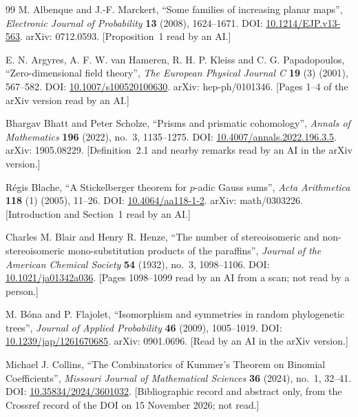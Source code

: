 \documentclass[11pt]{article}
\theoremstyle{definition}
\theoremstyle{remark}
\numberwithin{equation}{section}
\numberwithin{figure}{section}
\begin{document}
\begin{thebibliography}{99}\small
{}
M. Albenque and J.-F. Marckert, ``Some families of increasing planar maps'', \emph{Electronic Journal of
Probability} \textbf{13} (2008), 1624--1671. DOI: \href{https://doi.org/10.1214/EJP.v13-563}{10.1214/EJP.v13-563}.
arXiv: 0712.0593. [Proposition~1 read by an AI.]

E. N. Argyres, A. F. W. van Hameren, R. H. P. Kleiss and C. G. Papadopoulos, ``Zero-dimensional field theory'',
\emph{The European Physical Journal C} \textbf{19} (3) (2001), 567--582. DOI:
\href{https://doi.org/10.1007/s100520100630}{10.1007/s100520100630}. arXiv: hep-ph/0101346. [Pages 1--4 of the
arXiv version read by an AI.]

Bhargav Bhatt and Peter Scholze, ``Prisms and prismatic cohomology'', \emph{Annals of Mathematics}
\textbf{196} (2022), no.~3, 1135--1275. DOI:
\href{https://doi.org/10.4007/annals.2022.196.3.5}{10.4007/annals.2022.196.3.5}. arXiv: 1905.08229.
[Definition~2.1 and nearby remarks read by an AI in the arXiv version.]

R\'egis Blache, ``A Stickelberger theorem for $p$-adic Gauss sums'', \emph{Acta Arithmetica} \textbf{118} (1)
(2005), 11--26. DOI: \href{https://doi.org/10.4064/aa118-1-2}{10.4064/aa118-1-2}. arXiv: math/0303226.
[Introduction and Section~1 read by an AI.]

Charles M. Blair and Henry R. Henze, ``The number of stereoisomeric and non-stereoisomeric mono-substitution
products of the paraffins'', \emph{Journal of the American Chemical Society} \textbf{54} (1932), no.~3,
1098--1106. DOI: \href{https://doi.org/10.1021/ja01342a036}{10.1021/ja01342a036}. [Pages 1098--1099 read by
an AI from a scan; not read by a person.]

M. B\'ona and P. Flajolet, ``Isomorphism and symmetries in random phylogenetic trees'', \emph{Journal of
Applied Probability} \textbf{46} (2009), 1005--1019. DOI:
\href{https://doi.org/10.1239/jap/1261670685}{10.1239/jap/1261670685}. arXiv: 0901.0696. [Read by an AI in
the arXiv version.]

Michael J. Collins, ``The Combinatorics of Kummer's Theorem on Binomial Coefficients'', \emph{Missouri
Journal of Mathematical Sciences} \textbf{36} (2024), no.~1, 32--41. DOI:
\href{https://doi.org/10.35834/2024/3601032}{10.35834/2024/3601032}. [Bibliographic record and abstract
only, from the Crossref record of the DOI on 15 November 2026; not read.]


\end{thebibliography}
\end{document}
